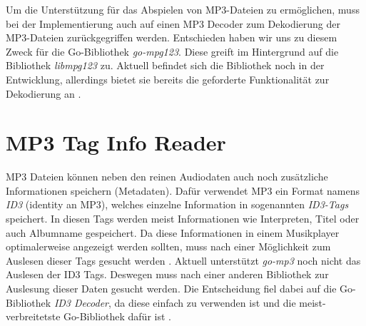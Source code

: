 Um die Unterstützung für das Abspielen von MP3-Dateien zu ermöglichen,
 muss bei der Implementierung auch auf einen MP3 Decoder zum
Dekodierung der MP3-Dateien zurückgegriffen werden. Entschieden haben wir uns
zu diesem Zweck für die Go-Bibliothek \textit{go-mpg123}. Diese greift im
Hintergrund auf die Bibliothek \textit{libmpg123} zu. Aktuell befindet sich die Bibliothek
noch in der Entwicklung, allerdings bietet sie bereits die geforderte
Funktionalität zur Dekodierung an \autocite{mp3_decoder}.

\section{MP3 Tag Info Reader}
MP3 Dateien können neben den reinen Audiodaten auch noch zusätzliche
Informationen speichern (Metadaten). Dafür verwendet MP3 ein Format namens
\textit{ID3} (identity an MP3), welches einzelne Information in
sogenannten \textit{ID3-Tags} speichert. In diesen Tags werden meist
Informationen wie Interpreten, Titel oder auch Albumname gespeichert. Da diese
Informationen in einem Musikplayer optimalerweise angezeigt werden sollten,
muss nach einer Möglichkeit zum Auslesen dieser Tags gesucht werden \autocite{id3}. \hfill
\break
Aktuell unterstützt \textit{go-mp3} noch nicht das Auslesen der ID3 Tags.
Deswegen muss nach einer anderen Bibliothek zur Auslesung dieser Daten gesucht
werden. Die Entscheidung fiel dabei auf die Go-Bibliothek \textit{ID3 Decoder},
da diese einfach zu verwenden ist und die meist-verbreitetste Go-Bibliothek
dafür ist \autocite{id3_go_2015}.
